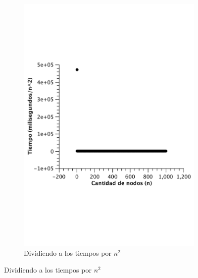 \begin{figure}[H]
        \begin{subfigure}[b]{0.25\textwidth}
                \includegraphics[width=\textwidth]{imagenes/vacio-listas-3.pdf}
                \caption{Dividiendo a los tiempos por $n^2$}
        \end{subfigure}


\end{figure}
